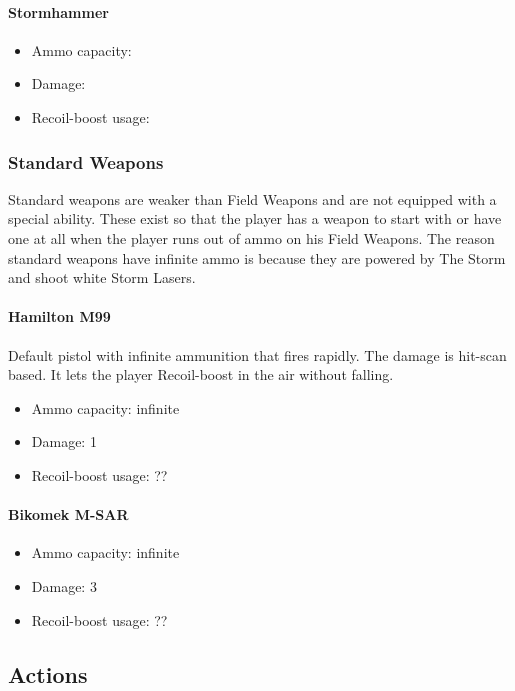 \documentclass[12pt]{article}
\begin{document}
\paragraph{Stormhammer}

\begin{itemize}
	\item Ammo capacity: 
	\item Damage: 
	\item Recoil-boost usage:
\end{itemize}

\subsubsection{Standard Weapons}

Standard weapons are weaker than Field Weapons and are not equipped with a special ability. These exist so that the player has a weapon to start with or have one at all when the player runs out of ammo on his Field Weapons. The reason standard weapons have infinite ammo is because they are powered by The Storm and shoot white Storm Lasers. 

\paragraph{Hamilton M99} 

Default pistol with infinite ammunition that fires rapidly. The damage is hit-scan based. It lets the player Recoil-boost in the air without falling.

\begin{itemize}
	\item Ammo capacity: infinite
	\item Damage: 1
	\item Recoil-boost usage: ??
\end{itemize}

\paragraph{Bikomek M-SAR} 

\begin{itemize}
	\item Ammo capacity: infinite
	\item Damage: 3
	\item Recoil-boost usage: ??
\end{itemize}

\subsection{Actions}
\end{document}
